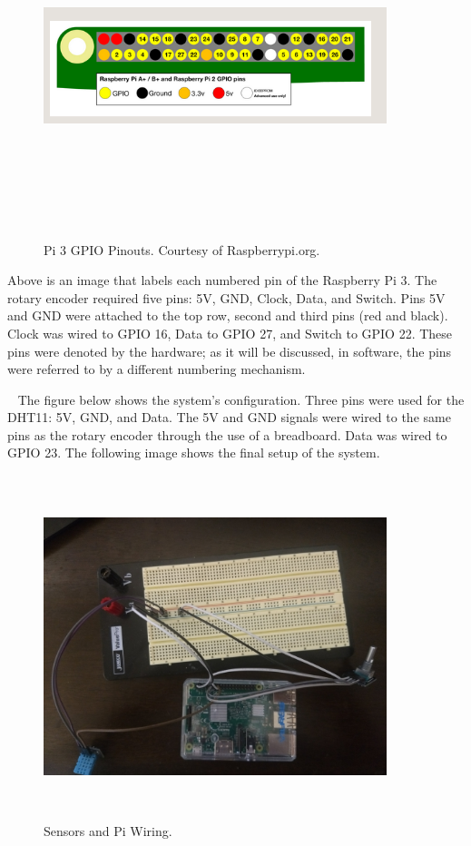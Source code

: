 \documentclass[letterpaper, 12pt]{article}
\begin{document}
\begin{figure}[H]
	\centering
	\includegraphics[width=10cm,height=10cm,keepaspectratio]{pi_GPIO.png}
	\caption[GPIO]{Pi 3 GPIO Pinouts. Courtesy of Raspberrypi.org.}
	\label{fig:GPIO}
\end{figure}

Above is an image that labels each numbered pin of the Raspberry Pi 3.
The rotary encoder required five pins: 5V, GND, Clock, Data, and Switch.  Pins 5V and GND were attached to the top row, second and third pins (red and black). Clock was wired to GPIO 16, Data to GPIO 27, and Switch to GPIO 22.  These pins were denoted by the hardware; as it will be discussed, in software, the pins were referred to by a different numbering mechanism.

~\newpage
The figure below shows the system's configuration.
Three pins were used for the DHT11: 5V, GND, and Data.  The 5V and GND signals were wired to the same pins as the rotary encoder through the use of a breadboard.  Data was wired to GPIO 23.  The following image shows the final setup of the system.

\begin{figure}[H]
	\centering
	\includegraphics[width=10cm,height=10cm,keepaspectratio]{circuit.jpg}
	\caption[Ciruit]{Sensors and Pi Wiring.}
	\label{fig:Circuit}
\end{figure}
~\newline
\end{document}

